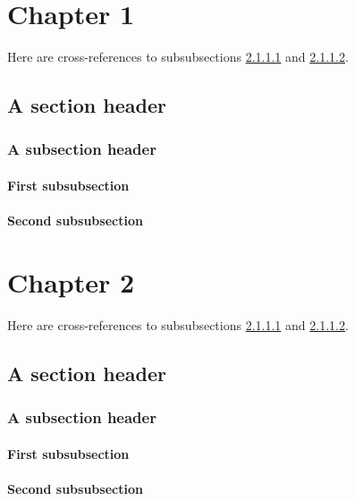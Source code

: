 \documentclass{report}
\begin{document}
\chapter{Chapter 1}

Here are cross-references to subsubsections \ref{sssec:num1} and \ref{sssec:num2}.

\section{A section header}
\subsection{A subsection header}
\subsubsection{First subsubsection} \label{sssec:num1}
\subsubsection{Second subsubsection} \label{sssec:num2}

\chapter{Chapter 2}

Here are cross-references to subsubsections \ref{sssec:num1} and \ref{sssec:num2}.

\section{A section header}
\subsection{A subsection header}
\subsubsection{First subsubsection} \label{sssec:num1}
\subsubsection{Second subsubsection} \label{sssec:num2}
\end{document}
